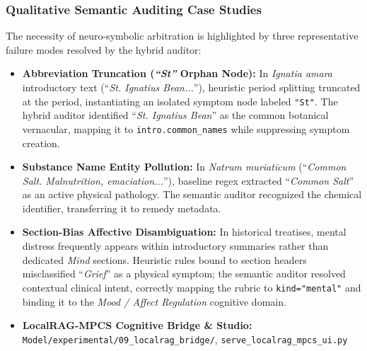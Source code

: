 \documentclass[10pt,twocolumn,letterpaper]{article}
\begin{document}
\begin{table}[h]
\centering
\caption{\textbf{Comparative Benchmark Evaluation of Extraction Paradigms (Gold Materia Medica Keynote Suite)}}
\label{tab:extraction_benchmark}
\end{table}

\subsubsection{Qualitative Semantic Auditing Case Studies}
The necessity of neuro-symbolic arbitration is highlighted by three representative failure modes resolved by the hybrid auditor:
\begin{itemize}
  \item \textbf{Abbreviation Truncation (\textit{``St''} Orphan Node):} In \textit{Ignatia amara} introductory text (``\textit{St. Ignatius Bean...}''), heuristic period splitting truncated at the period, instantiating an isolated symptom node labeled \texttt{"St"}. The hybrid auditor identified ``\textit{St. Ignatius Bean}'' as the common botanical vernacular, mapping it to \texttt{intro.common\_names} while suppressing symptom creation.
  \item \textbf{Substance Name Entity Pollution:} In \textit{Natrum muriaticum} (``\textit{Common Salt. Malnutrition, emaciation...}''), baseline regex extracted ``\textit{Common Salt}'' as an active physical pathology. The semantic auditor recognized the chemical identifier, transferring it to remedy metadata.
  \item \textbf{Section-Bias Affective Disambiguation:} In historical treatises, mental distress frequently appears within introductory summaries rather than dedicated \textit{Mind} sections. Heuristic rules bound to section headers misclassified ``\textit{Grief}'' as a physical symptom; the semantic auditor resolved contextual clinical intent, correctly mapping the rubric to \texttt{kind="mental"} and binding it to the \textit{Mood / Affect Regulation} cognitive domain.
  \item \textbf{LocalRAG-MPCS Cognitive Bridge \& Studio:} \nolinkurl{Model/experimental/09_localrag_bridge/}, \nolinkurl{serve_localrag_mpcs_ui.py}
\end{itemize}
\end{document}
